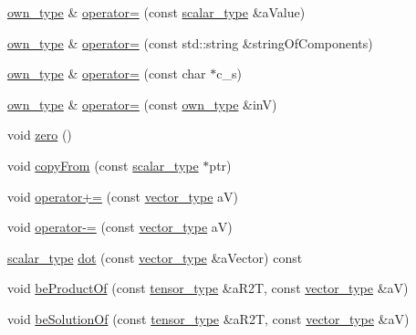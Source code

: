 \begin{DoxyCompactItemize}
\item 
\hyperlink{classcofe_1_1TensorRank1_aa4dd23616b69d69a174a7d52083f0d0c}{own\-\_\-type} \& \hyperlink{classcofe_1_1TensorRank1_a904e050179ba0832caf7973d4f954515}{operator=} (const \hyperlink{classcofe_1_1TensorRank1_a10a89d234fbdb6695e1da39745f998c6}{scalar\-\_\-type} \&a\-Value)
\item 
\hyperlink{classcofe_1_1TensorRank1_aa4dd23616b69d69a174a7d52083f0d0c}{own\-\_\-type} \& \hyperlink{classcofe_1_1TensorRank1_a6a21e0855a8e1d3e5eb78bc01446b021}{operator=} (const std\-::string \&string\-Of\-Components)
\item 
\hyperlink{classcofe_1_1TensorRank1_aa4dd23616b69d69a174a7d52083f0d0c}{own\-\_\-type} \& \hyperlink{classcofe_1_1TensorRank1_a2566b3123fe3f94a6b9676eb6b60936e}{operator=} (const char $\ast$c\-\_\-s)
\item 
\hyperlink{classcofe_1_1TensorRank1_aa4dd23616b69d69a174a7d52083f0d0c}{own\-\_\-type} \& \hyperlink{classcofe_1_1TensorRank1_a0d6c5c0cd541e686632bed4ba111ec8d}{operator=} (const \hyperlink{classcofe_1_1TensorRank1_aa4dd23616b69d69a174a7d52083f0d0c}{own\-\_\-type} \&in\-V)
\item 
void \hyperlink{classcofe_1_1TensorRank1_aa568accf451f9bb5cff0407df5a1567d}{zero} ()
\item 
void \hyperlink{classcofe_1_1TensorRank1_aa7eb281882a82f235ff4a7ca1dbc4146}{copy\-From} (const \hyperlink{classcofe_1_1TensorRank1_a10a89d234fbdb6695e1da39745f998c6}{scalar\-\_\-type} $\ast$ptr)
\item 
void \hyperlink{classcofe_1_1TensorRank1_ab39f015900a2b49b4f5e6c4cb9db7f2a}{operator+=} (const \hyperlink{classcofe_1_1TensorRank1_a3224169c2fe2e9df2d6206df73748e68}{vector\-\_\-type} a\-V)
\item 
void \hyperlink{classcofe_1_1TensorRank1_afbacc3a72943faeebdbabf49a67c093a}{operator-\/=} (const \hyperlink{classcofe_1_1TensorRank1_a3224169c2fe2e9df2d6206df73748e68}{vector\-\_\-type} a\-V)
\item 
\hyperlink{classcofe_1_1TensorRank1_a10a89d234fbdb6695e1da39745f998c6}{scalar\-\_\-type} \hyperlink{classcofe_1_1TensorRank1_a32678d6913a5f70191e2796d5acfa49a}{dot} (const \hyperlink{classcofe_1_1TensorRank1_a3224169c2fe2e9df2d6206df73748e68}{vector\-\_\-type} \&a\-Vector) const 
\item 
void \hyperlink{classcofe_1_1TensorRank1_a55c60b81097f43aa6274288d77f17d7c}{be\-Product\-Of} (const \hyperlink{classcofe_1_1TensorRank1_a1cca644cefcf4dafe9196b7a3017811c}{tensor\-\_\-type} \&a\-R2\-T, const \hyperlink{classcofe_1_1TensorRank1_a3224169c2fe2e9df2d6206df73748e68}{vector\-\_\-type} \&a\-V)
\item 
void \hyperlink{classcofe_1_1TensorRank1_add29081e2d5bcf9db8234944643211cc}{be\-Solution\-Of} (const \hyperlink{classcofe_1_1TensorRank1_a1cca644cefcf4dafe9196b7a3017811c}{tensor\-\_\-type} \&a\-R2\-T, const \hyperlink{classcofe_1_1TensorRank1_a3224169c2fe2e9df2d6206df73748e68}{vector\-\_\-type} \&a\-V)
\end{DoxyCompactItemize}

